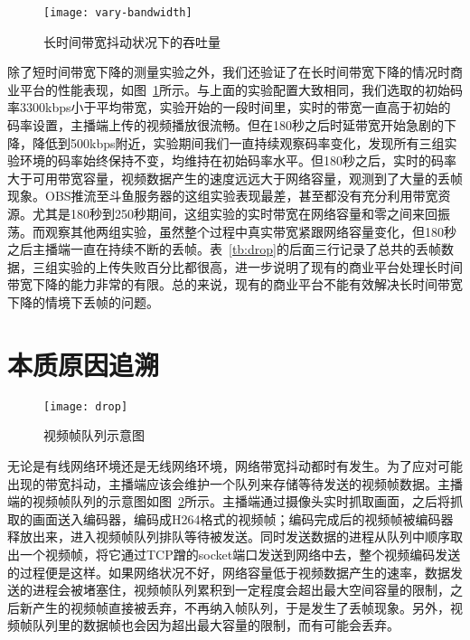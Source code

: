\begin{figure}[htb]%
  \centering
  \texttt{[image: vary-bandwidth]}
  \caption{长时间带宽抖动状况下的吞吐量}
  \label{fig:vary-bandwidth}
\end{figure}

除了短时间带宽下降的测量实验之外，我们还验证了在长时间带宽下降的情况时商业平台的性能表现，如图~\ref{fig:vary-bandwidth}所示。与上面的实验配置大致相同，我们选取的初始码率3300kbps小于平均带宽，实验开始的一段时间里，实时的带宽一直高于初始的码率设置，主播端上传的视频播放很流畅。但在180秒之后时延带宽开始急剧的下降，降低到500kbps附近，实验期间我们一直持续观察码率变化，发现所有三组实验环境的码率始终保持不变，均维持在初始码率水平。但180秒之后，实时的码率大于可用带宽容量，视频数据产生的速度远远大于网络容量，观测到了大量的丢帧现象。OBS推流至斗鱼服务器的这组实验表现最差，甚至都没有充分利用带宽资源。尤其是180秒到250秒期间，这组实验的实时带宽在网络容量和零之间来回振荡。而观察其他两组实验，虽然整个过程中真实带宽紧跟网络容量变化，但180秒之后主播端一直在持续不断的丢帧。表~\ref{tb:drop}的后面三行记录了总共的丢帧数据，三组实验的上传失败百分比都很高，进一步说明了现有的商业平台处理长时间带宽下降的能力非常的有限。总的来说，现有的商业平台不能有效解决长时间带宽下降的情境下丢帧的问题。

\section{本质原因追溯}

\begin{figure}[htb]%
  \centering
  \texttt{[image: drop]}
  \caption{视频帧队列示意图}
  \label{fig:drop}
\end{figure}

无论是有线网络环境还是无线网络环境，网络带宽抖动都时有发生。为了应对可能出现的带宽抖动，主播端应该会维护一个队列来存储等待发送的视频帧数据。主播端的视频帧队列的示意图如图~\ref{fig:drop}所示。主播端通过摄像头实时抓取画面，之后将抓取的画面送入编码器，编码成H264格式的视频帧；编码完成后的视频帧被编码器释放出来，进入视频帧队列排队等待被发送。同时发送数据的进程从队列中顺序取出一个视频帧，将它通过TCP蹭的socket端口发送到网络中去，整个视频编码发送的过程便是这样。如果网络状况不好，网络容量低于视频数据产生的速率，数据发送的进程会被堵塞住，视频帧队列累积到一定程度会超出最大空间容量的限制，之后新产生的视频帧直接被丢弃，不再纳入帧队列，于是发生了丢帧现象。另外，视频帧队列里的数据帧也会因为超出最大容量的限制，而有可能会丢弃。

